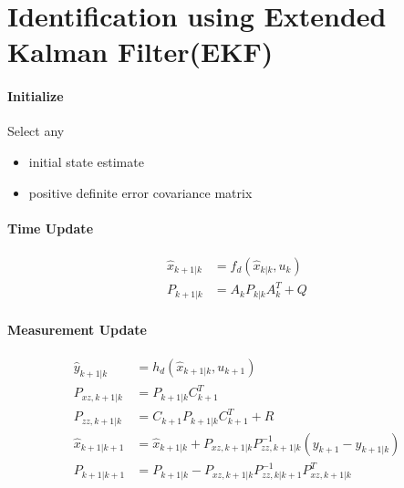	\section{Identification using Extended Kalman Filter(EKF)}
	
	\begin{tcolorbox}[title=DC Motor Parameters Identification with EKF]
		\paragraph{Initialize} Select any
		\begin{itemize}
			\item { initial state estimate}
			\item { positive definite error covariance matrix}
		\end{itemize}
		\paragraph{Time Update}
		\begin{equation}
			\begin{split}
				\hat{x}_{k+1|k} &= f_d(\hat{x}_{k|k},u_k)\\
				P_{k+1|k} &= A_kP_{k|k}A^T_k+Q
			\end{split}
			\label{dcmotorideq13}
		\end{equation}
		\paragraph{Measurement Update}
		\begin{equation}
			\begin{split}
				\hat{y}_{k+1|k} &= h_d(\hat{x}_{k+1|k},u_{k+1})\\
				P_{xz,k+1|k}    &= P_{k+1|k}C^T_{k+1}\\
				P_{zz,k+1|k}    &= C_{k+1}P_{k+1|k}C^T_{k+1}+R\\
				\hat{x}_{k+1|k+1} &= \hat{x}_{k+1|k} + P_{xz,k+1|k}P^{-1}_{zz,k+1|k}(y_{k+1}-\hat{y}_{k+1|k})\\
				P_{k+1|k+1}     &= P_{k+1|k} - P_{xz,k+1|k}P^{-1}_{zz,k|k+1}P^T_{xz,k+1|k} 
			\end{split}
			\label{dcmotorideq14}
		\end{equation}
	\end{tcolorbox}
	
	
